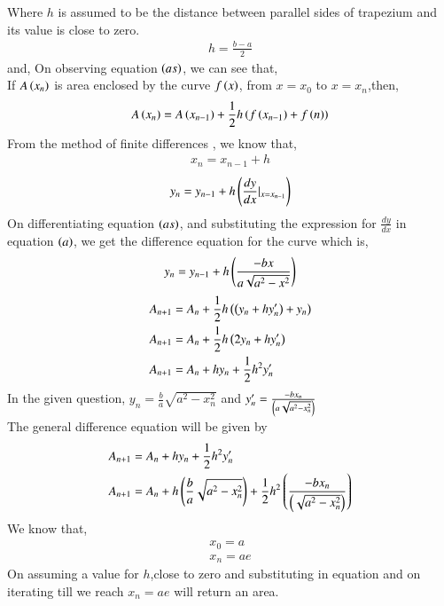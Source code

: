 \documentclass[journal]{IEEEtran}
\begin{document}
Where $h$ is assumed to be the distance between parallel sides of trapezium and its value is close to zero.
\begin{align}
    h = \frac{b - a}{2}
\end{align}
and,
On observing equation $\left(as\right)$, we can see that,\\
If $A\left(x_n\right)$ is area enclosed by the curve $f\left(x\right)$, from $x=x_0$ to $x=x_n$,then,
\begin{align}
    A\left(x_n\right) = A\left(x_{n-1}\right) + \frac{1}{2}h\left(f\left(x_{n-1}\right) + f\left(n\right)\right)
\end{align}
From the method of finite differences , we know that,
\begin{align}
    x_n = x_{n-1} + h
\end{align}
\begin{align}
    y_{n} = y_{n-1} + h\left(\frac{dy}{dx}|_{x=x_{n-1}}\right)
\end{align}
On differentiating equation $\left(as\right)$, and substituting the expression for $\frac{dy}{dx}$ in equation $\left(a\right)$, we get the difference equation for the curve which is,
\begin{align}
     y_{n} = y_{n-1} + h\left(\frac{-bx}{a\sqrt{a^2 - x^2}}\right)
\end{align}
\begin{align}
  A_{n+1}&=A_n+\frac{1}{2}h\left(\left(y_{n}+hy^{\prime}_n\right)+y_n\right)\\
  A_{n+1}&=A_n+\frac{1}{2}h\left(2y_n+hy^{\prime}_n\right)\\
  A_{n+1}&=A_n+hy_n+\frac{1}{2}h^2y^{\prime}_n\\
\end{align}
In the given question, $y_n=\frac{b}{a}\sqrt{a^2-x_n^2}$ and $y^{\prime}_n= \frac{-bx_n}{\left(a\sqrt{a^2-x_n^2}\right)}$\\
The general difference equation will be given by
\begin{align}
  A_{n+1}&=A_n+hy_n+\frac{1}{2}h^2y^{\prime}_n\\
  A_{n+1}&=A_n+h\left(\frac{b}{a}\sqrt{a^2-x_n^2}\right)+\frac{1}{2}h^2\left(\frac{-bx_n}{\left(\sqrt{a^2-x_n^2}\right)}\right)\\
\end{align}
We know that,
\begin{align}
    x_0 = a\\
    x_n = ae
\end{align}
On assuming a value for $h$,close to zero and substituting in equation and on iterating till we reach $x_n=ae$ will return an area.\\
\end{document}
